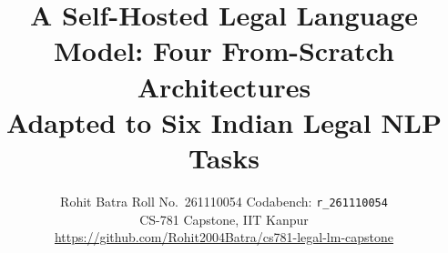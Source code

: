\documentclass[10pt,twocolumn]{article}
\usepackage[a4paper,margin=0.72in,columnsep=0.25in]{geometry}
\usepackage[T1]{fontenc}
\usepackage{times}
\usepackage{microtype}
\usepackage{graphicx}
\usepackage{booktabs}
\usepackage{tabularx}
\usepackage{longtable}
\usepackage{amsmath}
\usepackage{xcolor}
\usepackage[hidelinks]{hyperref}
\usepackage{enumitem}
\graphicspath{{figures/}}
\newcommand{\A}{\textsf{A}}\newcommand{\B}{\textsf{B}}\newcommand{\C}{\textsf{C}}\newcommand{\D}{\textsf{D}}

\title{\vspace{-1.2em}A Self-Hosted Legal Language Model: Four From-Scratch Architectures\\
Adapted to Six Indian Legal NLP Tasks\vspace{-0.3em}}
\author{Rohit Batra \quad Roll No.\ 261110054 \quad Codabench: \texttt{r\_261110054}\\
CS-781 Capstone, IIT Kanpur\\ \small\url{https://github.com/Rohit2004Batra/cs781-legal-lm-capstone}}
\date{\vspace{-1.5em}}


\maketitle

\begin{abstract}
We train four compact language models from scratch (103--139M parameters) on the official Indian legal corpus: a decoder-only Transformer (\A), an encoder--decoder Transformer (\B), a stacked LSTM (\C) and a dilated residual TCN (\D). We adapt them, without any external weights, to named-entity recognition, rhetorical roles, judgment prediction, statute identification, summarisation and prior-case retrieval.
Across 38 submissions we compare full, layer-wise and bias-only fine-tuning; LoRA, LORMA, IA$^3$, prefix and prompt tuning; adapters; and knowledge distillation (KD).
\begin{itemize}
\item \textbf{Best results:} 0.806 BERTScore (pretraining), 0.491 strict Macro-F1 (NER), 0.518 Macro-F1 (rhetorical roles), 0.680 Macro-F1 (judgment), 0.304 Macro-F1 (statutes), 0.835 BERTScore (summaries) and 0.253 Micro-F1@7 (retrieval).
\item \textbf{The backbone mattered:} the decoder \A{} transferred best to every task except character-level NER.
\item \textbf{Three methods mattered most:} a linear-probe-then-fine-tune schedule (LP-FT), which ended a series of training collapses; per-label decision calibration; and distillation, which twice produced a smaller student that beat its own teacher.
\end{itemize}
\end{abstract}

